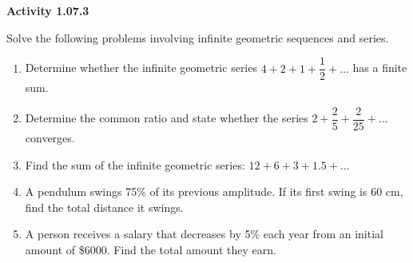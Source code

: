 \vspace{0.3ex}
\noindent\textbf{Activity 1.07.3}

\vspace{0.2ex}

Solve the following problems involving infinite geometric sequences and series.
\begin{enumerate}
    \item Determine whether the infinite geometric series \(4 + 2 + 1 + \dfrac{1}{2} + \dots\) has a finite sum.
    \item Determine the common ratio and state whether the series \(2 + \dfrac{2}{5} + \dfrac{2}{25} + \dots\) converges.
    \item Find the sum of the infinite geometric series: \(12 + 6 + 3 + 1.5 + \dots\)
    \item A pendulum swings 75\% of its previous amplitude. If its first swing is 60 cm, find the total distance it swings.
    \item A person receives a salary that decreases by 5\% each year from an initial amount of \$6000. Find the total amount they earn.
\end{enumerate}
